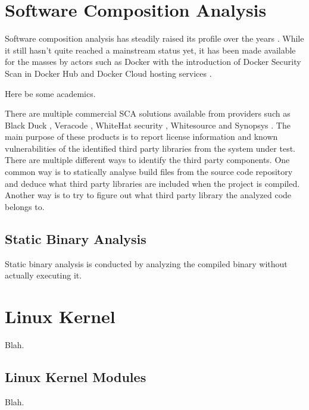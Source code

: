 
\section{Software Composition Analysis}

Software composition analysis has steadily raised its profile over the years \cite{sauce}. While it
still hasn't quite reached a mainstream status yet, it has been made available for the masses by
actors such as Docker with the introduction of Docker Security Scan in Docker Hub and Docker Cloud
hosting services \cite{dockerscan}.

Here be some academics.

There are multiple commercial SCA solutions available from providers such as Black Duck
\cite{sauce}, Veracode \cite{sauce}, WhiteHat security \cite{sauce}, Whitesource \cite{sauce} and
Synopsys \cite{sauce}. The main purpose of these products is to report license information and
known vulnerabilities of the identified third party libraries from the system under test. There
are multiple different ways to identify the third party components. One common way is to statically
analyse build files from the source code repository and deduce what third party libraries are
included when the project is compiled. Another way is to try to figure out what third party
library the analyzed code belongs to.

\subsection{Static Binary Analysis}

Static binary analysis is conducted by analyzing the compiled binary without actually executing it.

\section{Linux Kernel}

Blah.

\subsection{Linux Kernel Modules}

Blah.

